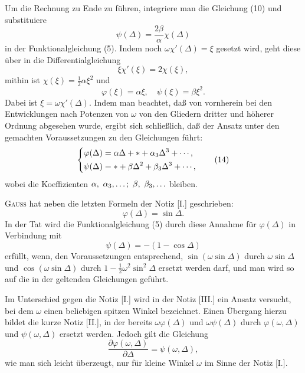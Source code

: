 \indent Um die Rechnung zu Ende zu führen, integriere man die Gleichung (10) und substituiere
\begin{equation}\psi(\Delta)=\frac{2\beta}{\alpha}\chi(\Delta)\tag{11}\end{equation}
\noindent in der Funktionalgleichung (5). Indem noch \(\omega\chi'(\Delta)=\xi\) gesetzt wird, geht diese über in die Differentialgleichung
\begin{equation}\xi\chi'(\xi)=2\chi(\xi),\tag{12}\end{equation}
\noindent mithin ist \(\chi(\xi)=\tfrac12\alpha\xi^2\) und
\begin{equation}\varphi(\xi)=\alpha\xi,\quad\psi(\xi)=\beta\xi^2.\tag{13}\end{equation}
\noindent Dabei ist \(\xi=\omega\chi'(\Delta)\). Indem man beachtet, daß von vornherein bei den Entwicklungen nach Potenzen von \(\omega\) von den Gliedern dritter und höherer Ordnung abgesehen wurde, ergibt sich schließlich, daß der Ansatz unter den gemachten Voraussetzungen zu den Gleichungen führt:
\begin{equation}
\left\{\begin{aligned}
\varphi(\Delta)&=\alpha\Delta+\ast+\alpha_3\Delta^3+\mathinner{\cdotp\cdotp\cdotp},\\
\psi(\Delta)&=\ast+\beta\Delta^2+\beta_3\Delta^3+\mathinner{\cdotp\cdotp\cdotp},
\end{aligned}\right.\tag{14}
\end{equation}
\noindent wobei die Koeffizienten \(\alpha,\ \alpha_3,\mathinner{\ldotp\ldotp\ldotp};\ \beta,\ \beta_3,\mathinner{\ldotp\ldotp\ldotp}\)  bleiben.

\indent \textsc{Gauss} hat neben die letzten Formeln der Notiz [I.] geschrieben:
\[\varphi(\Delta)=\sin\Delta.\]
\noindent In der Tat wird die Funktionalgleichung (5) durch diese Annahme für \(\varphi(\Delta)\) in Verbindung mit
\[\psi(\Delta)=-(1-\cos\Delta)\]
\noindent erfüllt, wenn, den Voraussetzungen entsprechend, \(\sin(\omega\sin\Delta)\) durch \(\omega\sin\Delta\) und \(\cos(\omega\sin\Delta)\) durch \(1-\tfrac12\omega^2\sin^2\Delta\) ersetzt werden darf, und man wird so auf die in der  geltenden Gleichungen geführt.

\indent Im Unterschied gegen die Notiz [I.] wird in der Notiz [III.] ein Ansatz versucht, bei dem \(\omega\) einen beliebigen spitzen Winkel bezeichnet. Einen Übergang hierzu bildet die kurze Notiz [II.], in der bereits \(\omega\varphi(\Delta)\) und \(\omega\psi(\Delta)\) durch \(\varphi(\omega,\Delta)\) und \(\psi(\omega,\Delta)\) ersetzt werden. Jedoch gilt die Gleichung
\[\frac{\partial\varphi(\omega,\Delta)}{\partial\Delta}=\psi(\omega,\Delta),\]
\noindent wie man sich leicht überzeugt, nur für kleine Winkel \(\omega\) im Sinne der Notiz [I.].

